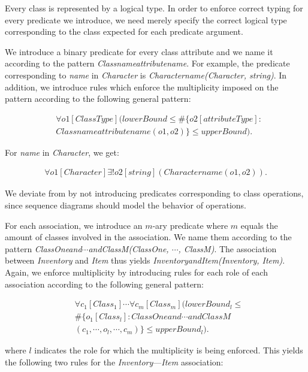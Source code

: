 \documentclass[conference]{IEEEtran}
\begin{document}
Every class is represented by a logical type. In order to enforce correct typing for every predicate we introduce, we need merely specify the correct logical type corresponding to the class expected for each predicate argument.

We introduce a binary predicate for every class attribute and we name it according to the pattern \textit{Classnameattributename}. For example, the predicate corresponding to \textit{name} in \textit{Character} is \textit{Charactername(Character, string)}. In addition, we introduce rules which enforce the multiplicity imposed on the pattern according to the following general pattern:

\begin{align*}
	&\forall{o1}[ClassType](lowerBound \leq \#\{o2[attributeType] : \\ &Classnameattributename(o1, o2)\} \leq upperBound).
\end{align*}

For \textit{name} in \textit{Character}, we get:

\begin{align*}
	\forall{o1}[Character]\exists!{o2}[string](Charactername(o1, o2)).
\end{align*}

We deviate from \cite{BerardiDaniela2005RoUc} by not introducing predicates corresponding to class operations, since sequence diagrams should model the behavior of operations.

For each association, we introduce an $m$-ary predicate where $m$ equals the amount of classes involved in the association. We name them according to the pattern \textit{ClassOneand$\cdots$andClassM(ClassOne, $\cdots$, ClassM)}. The association between \textit{Inventory} and \textit{Item} thus yields \textit{InventoryandItem(Inventory, Item)}. Again, we enforce multiplicity by introducing rules for each role of each association according to the following general pattern:

\begin{align*}
	&\forall{c_1}[Class_1]\cdots{}\forall{c_m}[Class_m](lowerBound_l \leq \\ &\#\{o_1[Class_l] : ClassOneand\cdots{}andClassM\\&(c_1, \cdots, o_l, \cdots, c_m)\} \leq upperBound_l).
\end{align*}

where $l$ indicates the role for which the multiplicity is being enforced. This yields the following two rules for the \textit{Inventory}---\textit{Item} association:
\end{document}

